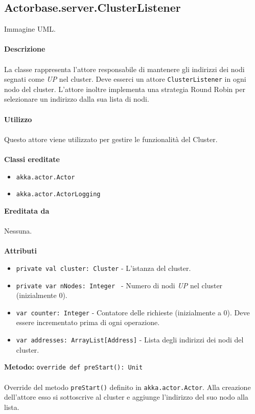 \documentclass[a4paper]{article}
\begin{document}
		\subsection{Actorbase.server.ClusterListener }
		Immagine UML.
		\\ \\
		\textbf{Descrizione}
			\\ \\
			La classe rappresenta l'attore responsabile di mantenere gli indirizzi dei nodi segnati come \emph{UP} nel cluster. Deve esserci un attore \texttt{ClusterListener} in ogni nodo del cluster. L'attore inoltre implementa una strategia Round Robin per selezionare un indirizzo dalla sua lista di nodi.
			\\ \\
		\textbf{Utilizzo}
			\\ \\
			Questo attore viene utilizzato per gestire le funzionalità del Cluster.
			\\ \\
		\textbf{Classi ereditate}
			\begin{itemize}
				\item \texttt{akka.actor.Actor}
				\item \texttt{akka.actor.ActorLogging}
			\end{itemize}
		\textbf{Ereditata da}
			\\ \\
			Nessuna.
			\\ \\
		\textbf{Attributi}
			\begin{itemize}
				\item \texttt{private val cluster: Cluster} - L'istanza del cluster.
				\item \texttt{private var nNodes: Integer } - Numero di nodi \emph{UP} nel cluster (inizialmente 0).
				\item \texttt{var counter: Integer} - Contatore delle richieste (inizialmente a 0). Deve essere incrementato prima di ogni operazione.
				\item \texttt{var addresses: ArrayList[Address]} - Lista degli indirizzi dei nodi del cluster.
			\end{itemize}
			\textbf{Metodo: }\texttt{override def preStart(): Unit}
			\\ \\
			Override del metodo \texttt{preStart()} definito in \texttt{akka.actor.Actor}. Alla creazione dell'attore esso si sottoscrive al cluster e aggiunge l'indirizzo del suo nodo alla lista.
\end{document}
